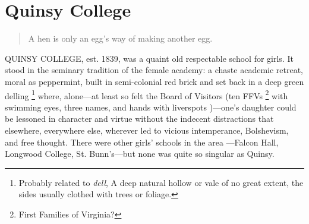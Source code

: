 \chapter{ Quinsy College}

\begin{quotation}
  A hen is only an egg's way of making another egg.
\end{quotation}
 
  QUINSY COLLEGE, est. 1839, was a quaint 
old respectable school for girls. It
stood in the seminary tradition of the female academy: a chaste 
academic retreat, moral as peppermint, 
built in semi-colonial red brick and set back in a deep green delling 
\footnote{ \textdbend Probably related to \textit{dell}, A deep natural hollow
  or vale of no great extent, the sides usually clothed with trees or foliage.}
where, alone---at least so felt the Board of Visitors (ten FFVs
\footnote{\textdbend First Families of Virginia?}
with swimming eyes, three names, and hands with liverspots
)---one's daughter could
be lessoned in character and virtue without the indecent distractions that
elsewhere, everywhere else, wherever led to vicious intemperance, 
Bolshevism, and free thought. There were other girls' schools in the area 
---Falcon Hall, Longwood College, St. Bunn's---but none was quite so singular 
as Quinsy.

